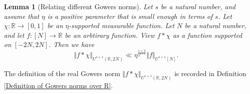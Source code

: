 \documentclass[12pt,a4paper,twoside,reqno]{amsart}
\newtheorem{Lemma}[Theorem]{Lemma}
\numberwithin{equation}{section}
\begin{document}
\begin{Lemma}[Relating different Gowers norms]
\label{Lemma linking different Gowers norms}
Let $s$ be a natural number, and assume that $\eta$ is a positive parameter that is small enough in terms of $s$. Let $\chi:\mathbb{R}\longrightarrow [0,1]$ be an $\eta$-supported measurable function. Let $N$ be a natural number, and let $f:[N]\longrightarrow \mathbb{R}$ be an arbtirary function. View $f\ast \chi$ as a function supported on $[-2N,2N]$. Then we have \begin{equation}
\label{linking different gowers norms}
\Vert f\ast \chi\Vert_{U^{s+1}(\mathbb{R},2N)}\ll \eta^{\frac{s+2}{2^{s+1}}} \Vert f\Vert_{U^{s+1}[N]}. 
\end{equation}
\end{Lemma}
\noindent The definition of the real Gowers norm $\Vert f\ast \chi\Vert_{U^{s+1}(\mathbb{R},2N)}$ is recorded in Definition \ref{Definition of Gowers norms over R}. 
\end{document}
